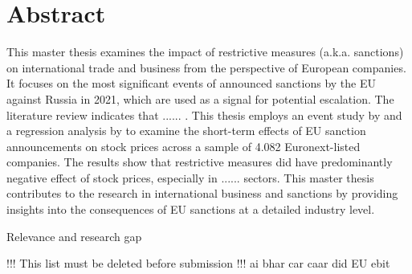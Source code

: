 \documentclass[12pt,a4paper]{article}
\begin{document}
\section*{Abstract}
This master thesis examines the impact of restrictive measures (a.k.a. sanctions) on international trade and business from the perspective of European companies. It focuses on the most significant events of announced sanctions by the EU against Russia in 2021, which are used as a signal for potential escalation. The literature review indicates that ...... . This thesis employs an event study by \cite{brown_using_1985} and a regression analysis by \cite{fama_size_1995} to examine the short-term effects of EU sanction announcements on stock prices across a sample of 4.082 Euronext-listed companies. The results show that restrictive measures did have predominantly negative effect of stock prices, especially in ...... sectors. This master thesis contributes to the research in international business and sanctions by providing insights into the consequences of EU sanctions at a detailed industry level.    


Relevance and research gap
\newline
        
        
!!! This list must be deleted before submission !!!
\gls{ai}
\gls{bhar}
\gls{car}
\gls{caar}
\gls{did}
\gls{EU}
\gls{ebit}


\end{document}
